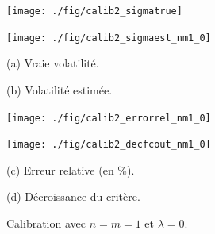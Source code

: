 \begin{figure}[!htbp]

\begin{center}
\begin{minipage}{5.8cm}
\centerline{\texttt{[image: ./fig/calib2\_sigmatrue]}
} 
\end{minipage}
\hspace*{0.1cm}
\begin{minipage}{5.8cm}
\centerline{\texttt{[image: ./fig/calib2\_sigmaest\_nm1\_0]}
}
\end{minipage}
\end{center}

\begin{center}
\begin{minipage}{5.8cm}
(a) Vraie volatilit\'e.
\end{minipage}
\hspace*{0.1cm}
\begin{minipage}{5.8cm}
(b) Volatilit\'e estim\'ee.
\end{minipage}
\end{center}

\medskip

\begin{center}
\begin{minipage}{5.8cm}
\centerline{\texttt{[image: ./fig/calib2\_errorrel\_nm1\_0]}
}
\end{minipage}
\hspace*{0.1cm}
\begin{minipage}{5.8cm}
\centerline{\texttt{[image: ./fig/calib2\_decfcout\_nm1\_0]}
}
\end{minipage}
\end{center}

\begin{center}
\begin{minipage}{5.8cm}
(c) Erreur relative (en \%).
\end{minipage}
\hspace*{0.1cm}
\begin{minipage}{5.8cm}
(d) D\'ecroissance du crit\`ere.
\end{minipage}
\end{center}

\caption{Calibration avec $n = m = 1$ et $\lambda = 0$.}
\label{FIG:CALIB2_NM1_0}
\end{figure}

\pagebreak

